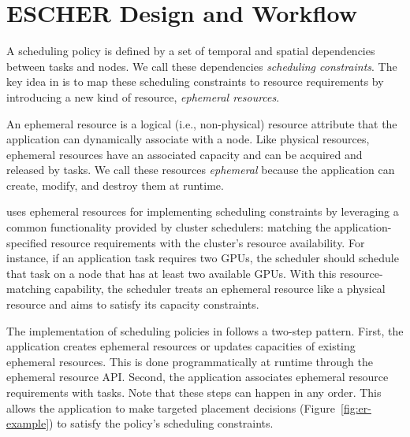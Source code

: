 \section{ESCHER Design and Workflow}
\label{sec:arch}


A scheduling policy is defined by a set of temporal and spatial dependencies between tasks and nodes. We call these dependencies \emph{scheduling constraints}. 
The key idea in \name{} is to map these scheduling constraints to resource requirements by introducing a new kind of resource, \emph{ephemeral resources}.

 An ephemeral resource is a logical (i.e., non-physical) resource attribute that the application can dynamically associate with a node. Like physical resources, ephemeral resources have an associated capacity and can be acquired and released by tasks. 
We call these resources \emph{ephemeral} because the application can create, modify, and destroy them at runtime.

\name{} uses ephemeral resources for implementing scheduling constraints by leveraging a common functionality provided by cluster schedulers: matching the application-specified resource requirements with the cluster's resource availability. For instance, if an application task requires two GPUs, the scheduler should schedule that task on a node that has at least two available GPUs. With this resource-matching capability, the scheduler treats an ephemeral resource like a physical resource and aims to satisfy its capacity constraints.

The implementation of scheduling policies in \name{} follows a two-step pattern. First, the application creates ephemeral resources or updates capacities of existing ephemeral resources. This is done programmatically at runtime through the ephemeral resource API. Second, the application associates ephemeral resource requirements with tasks.
Note that these steps can happen in any order.
This allows the application to make targeted placement decisions (Figure~\ref{fig:er-example}) to satisfy the policy's scheduling constraints.

